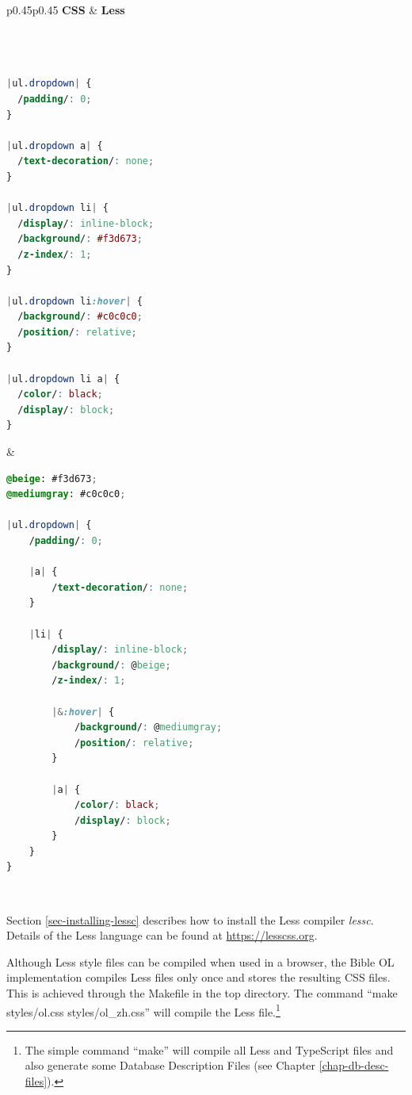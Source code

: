 \documentclass[11pt,oneside,a4paper]{memoir}
\begin{document}
\lstset{frame=} %

\begin{center}
\begin{tabular}{p{}p{}}
\hline
\textbf{CSS} & \textbf{Less}\\
\hline
\begin{lstlisting}[language=CSS,aboveskip=0mm,belowskip=0mm]



|ul.dropdown| {
  /padding/: 0;
}

|ul.dropdown a| {
  /text-decoration/: none;
}

|ul.dropdown li| {
  /display/: inline-block;
  /background/: #f3d673;
  /z-index/: 1;
}

|ul.dropdown li:hover| {
  /background/: #c0c0c0;
  /position/: relative;
}

|ul.dropdown li a| {
  /color/: black;
  /display/: block;
}
\end{lstlisting}

&

\begin{lstlisting}[language=CSS,aboveskip=0mm,belowskip=0mm]
@beige: #f3d673;
@mediumgray: #c0c0c0;

|ul.dropdown| {
    /padding/: 0;

    |a| {
        /text-decoration/: none;
    }

    |li| {
        /display/: inline-block;
        /background/: @beige;
        /z-index/: 1;

        |&:hover| {
            /background/: @mediumgray;
            /position/: relative;
        }

        |a| {
            /color/: black;
            /display/: block;
        }
    }
}
\end{lstlisting}\\
\hline
\end{tabular}
\end{center}


\lstset{frame=tb} %


Section \ref{sec-installing-lessc} describes how to install the Less compiler
\emph{lessc}. Details of the Less language can be found at \url{https://lesscss.org}.

Although Less style files can be compiled when used in a browser, the Bible OL implementation
compiles Less files only once and stores the resulting CSS files. This is achieved through the
Makefile in the top directory. The command ``make styles/ol.css
styles/ol\_zh.css'' will compile the Less file.\footnote{The simple command ``make'' will compile
  all Less and TypeScript files and also generate some Database Description Files (see Chapter
  \ref{chap-db-desc-files}).}
\end{document}
